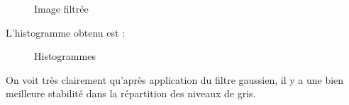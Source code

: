 \documentclass[french,a4paper,10pt]{article}
\begin{document}
\begin{figure}[!htb]
\begin{minipage}{0.48\textwidth}
            \caption{Image filtrée}\label{Fig:filtre-gaussien-peppers-grey}
        \end{minipage}
    \end{figure}

    L'histogramme obtenu est :
    \begin{figure}[!htb]
        \begin{minipage}{0.48\textwidth}
            \centering
            \caption{Histogrammes}\label{Fig:peppers-grey-2}
        \end{minipage}
    \end{figure}

    On voit très clairement qu'après application du filtre gaussien, il y a une bien meilleure 
    stabilité dans la répartition des niveaux de gris.
\end{document}
